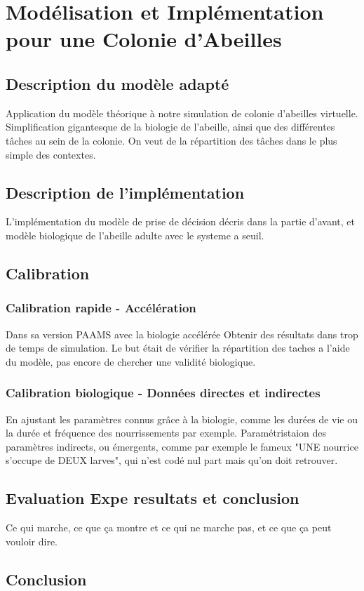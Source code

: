 \documentclass[11pt,a4paper]{report}
\begin{document}
\chapter{Modélisation et Implémentation pour une Colonie d'Abeilles}
	\section{Description du modèle adapté}
		Application du modèle théorique à notre simulation de colonie d'abeilles virtuelle.
		Simplification gigantesque de la biologie de l'abeille, ainsi que des différentes tâches au sein de la colonie.
		On veut de la répartition des tâches dans le plus simple des contextes.
	\section{Description de l'implémentation}
		L'implémentation du modèle de prise de décision décris dans la partie d'avant, et modèle biologique de l'abeille adulte avec le systeme a seuil.
	\section{Calibration}
		\subsection{Calibration rapide - Accélération}
			Dans sa version PAAMS avec la biologie accélérée
			Obtenir des résultats dans trop de temps de simulation. Le but était de vérifier la répartition des taches a l'aide du modèle, pas encore de chercher une validité biologique.
		\subsection{Calibration biologique - Données directes et indirectes}
			En ajustant les paramètres connus grâce à la biologie, comme les durées de vie ou la durée et fréquence des nourrissements par exemple.
			Paramétristaion des paramètres indirects, ou émergents, comme par exemple le fameux "UNE nourrice s'occupe de DEUX larves", qui n'est codé nul part mais qu'on doit retrouver.
	\section{Evaluation Expe resultats et conclusion}
		Ce qui marche, ce que ça montre et ce qui ne marche pas, et ce que ça peut vouloir dire.
			
	\section*{Conclusion}
	
\end{document}
